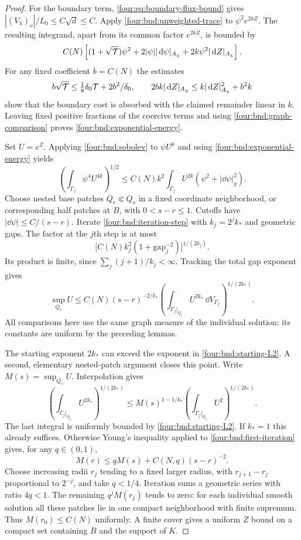 \begin{proof}
For the boundary term, \eqref{four:eq:boundary-flux-bound} gives
$|(V_\lambda)_\nu|/L_0\le C\sqrt d\le C$.
Apply \eqref{four:bnd:unweighted-trace} to $\psi^2e^{2kZ}$.
The resulting integrand, apart from its common factor $e^{2kZ}$,
is bounded by
\[
 C(N)\left[(1+\sqrt{\mathcal T})\psi^2
      +2|\psi||\,\mathrm d\psi|_{A_\chi}
      +2k\psi^2|\,\mathrm d Z|_{A_\chi}\right].
\]
For any fixed coefficient $b=C(N)$ the estimates
\[
 b\sqrt{\mathcal T}\le\tfrac18\delta_0\mathcal T+2b^2/\delta_0,
 \qquad
 2bk|\,\mathrm d Z|_{A_\chi}
       \le k|\,\mathrm d Z|_{A_\chi}^2+b^2k
\]
show that the boundary cost is absorbed with the claimed remainder
linear in $k$.
Leaving fixed positive fractions of the coercive terms and using
\eqref{four:bnd:graph-comparison} proves
\eqref{four:bnd:exponential-energy}.

Set $U=e^Z$.  Applying \eqref{four:bnd:sobolev} to $\psi U^k$ and
using \eqref{four:bnd:exponential-energy} yields
\begin{equation}\label{four:bnd:iteration-step}
 \left(\int_{\Gamma_f}\psi^4U^{4k}\right)^{1/2}
 \le C(N)k^2\int_{\Gamma_f}U^{2k}
                      (\psi^2+|\dd\psi|_g^2).
\end{equation}
Choose nested base patches $Q_r\Subset Q_s$ in a fixed coordinate
neighborhood, or corresponding half patches at $B$, with
$0<s-r\le1$.  Cutoffs have $|\dd\psi|\le C/(s-r)$.
Iterate \eqref{four:bnd:iteration-step} with
$k_j=2^jk_*$ and geometric gaps.  The factor at the $j$th step is
at most
\[
 \bigl[C(N)k_j^2(1+\mathrm{gap}_j^{-2})\bigr]^{1/(2k_j)}.
\]
Its product is finite, since $\sum_j(j+1)/k_j<\infty$.
Tracking the total gap exponent gives
\begin{equation}\label{four:bnd:first-iteration}
 \sup_{Q_r}U\le C(N)(s-r)^{-2/k_*}
    \left(\int_{\Gamma_f\vert_{Q_s}}U^{2k_*}
                         \,\dd V_{\Gamma_f}\right)^{1/(2k_*)}.
\end{equation}
All comparisons here use the same graph measure of the individual
solution; its constants are uniform by the preceding lemmas.

The starting exponent $2k_*$ can exceed the exponent in
\eqref{four:bnd:starting-L2}.  A second, elementary nested-patch argument
closes this point.  Write $M(s)=\sup_{Q_s}U$.  Interpolation gives
\[
 \left(\int_{\Gamma_f\vert_{Q_s}}U^{2k_*}\right)^{1/(2k_*)}
 \le M(s)^{1-1/k_*}
       \left(\int_{\Gamma_f\vert_{Q_s}}U^2\right)^{1/(2k_*)}.
\]
The last integral is uniformly bounded by \eqref{four:bnd:starting-L2}.
If $k_*=1$ this already suffices.  Otherwise Young's inequality
applied to \eqref{four:bnd:first-iteration} gives, for any $q\in(0,1)$,
\begin{equation}\label{four:bnd:second-iteration}
 M(r)\le qM(s)+C(N,q)(s-r)^{-2}.
\end{equation}
Choose increasing radii $r_j$ tending to a fixed larger radius,
with $r_{j+1}-r_j$ proportional to $2^{-j}$, and take $q<1/4$.
Iteration sums a geometric series with ratio $4q<1$.
The remaining $q^jM(r_j)$ tends to zero: for each individual
smooth solution all these patches lie in one compact neighborhood
with finite supremum.  Thus $M(r_0)\le C(N)$ uniformly.  A finite
cover gives a uniform $Z$ bound on a compact set containing $B$
and the support of $K$.


\end{proof}
